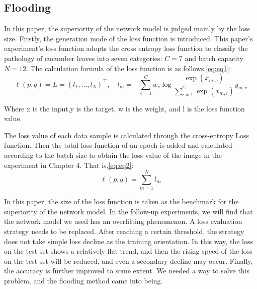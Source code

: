 \documentclass[a4paper,fleqn]{cas-sc}
\begin{document}
\subsection{Flooding}
In this paper, the superiority of the network model is judged mainly by the loss size. Firstly, the generation mode of the loss function is introduced. This paper's experiment's loss function adopts the cross entropy loss function to classify the pathology of cucumber leaves into seven categories: $C=7$ and batch capacity $N=12$. The calculation formula of the loss function is as follows.\ref{eq:eq1}:
\begin{equation}
\label{eq:eq1}
\ell(p, q)=L=\left\{l_{1}, \ldots, l_{N}\right\}^{\top}, \quad l_{m}=-\sum_{c=1}^{C} w_{c} \log \frac{\exp \left(x_{m, c}\right)}{\sum_{i=1}^{C} \exp \left(x_{m, i}\right)} y_{m, c}
\end{equation}

Where x is the input,y is the target, w is the weight, and l is the loss function value. 

The loss value of each data sample is calculated through the cross-entropy Loss function. Then the total loss function of an epoch is added and calculated according to the batch size to obtain the loss value of the image in the experiment in Chapter 4. That is,\ref{eq:eq2}:
\begin{equation}
\label{eq:eq2}
\ell(p,q)=\sum_{m=1}^{N} l_{m}
\end{equation}

In this paper, the size of the loss function is taken as the benchmark for the superiority of the network model. In the follow-up experiments, we will find that the network model we used has an overfitting phenomenon. A loss evaluation strategy needs to be replaced. After reaching a certain threshold, the strategy does not take simple loss decline as the training orientation. In this way, the loss on the test set shows a relatively flat trend, and then the rising speed of the loss on the test set will be reduced, and even a secondary decline may occur. Finally, the accuracy is further improved to some extent. We needed a way to solve this problem, and the flooding method came into being. \cite{ishida2020we}
\end{document}
